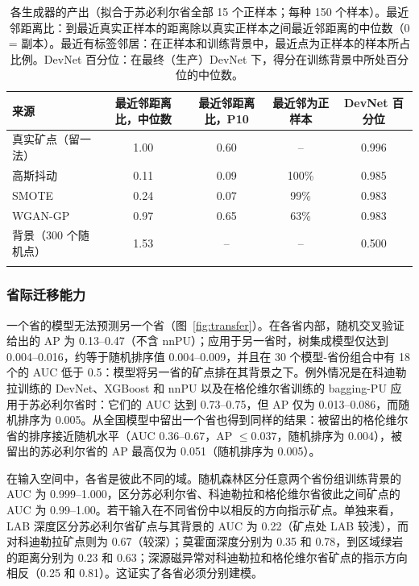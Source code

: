 \documentclass[pdflatex,sn-apa]{sn-jnl}
\begin{document}
\begin{table}[t]
\caption{各生成器的产出（拟合于苏必利尔省全部 15 个正样本；每种 150 个样本）。最近邻距离比：到最近真实正样本的距离除以真实正样本之间最近邻距离的中位数（0 = 副本）。最近有标签邻居：在正样本和训练背景中，最近点为正样本的样本所占比例。DevNet 百分位：在最终（生产）DevNet 下，得分在训练背景中所处百分位的中位数。}\label{tab:aug-diag}
\footnotesize
\setlength{\tabcolsep}{2.5pt}
\begin{tabular*}{\textwidth}{@{\extracolsep\fill}lcccc}
\toprule
来源 & 最近邻距离比，中位数 & 最近邻距离比，P10 & 最近邻为正样本 & DevNet 百分位 \\
\midrule
真实矿点（留一法） & 1.00 & 0.60 & -- & 0.996 \\
高斯抖动 & 0.11 & 0.09 & 100\% & 0.985 \\
SMOTE & 0.24 & 0.07 & 99\% & 0.983 \\
WGAN-GP & 0.97 & 0.65 & 63\% & 0.983 \\
背景（300 个随机点） & 1.53 & -- & -- & 0.500 \\
\botrule
\end{tabular*}
\end{table}

\subsubsection{省际迁移能力}\label{sec:res-transfer}

一个省的模型无法预测另一个省（图~\ref{fig:transfer}）。在各省内部，随机交叉验证给出的 AP 为 0.13--0.47（不含 nnPU）；应用于另一省时，树集成模型仅达到 0.004--0.016，约等于随机排序值 0.004--0.009，并且在 30 个模型-省份组合中有 18 个的 AUC 低于 0.5：模型将另一省的矿点排在其背景之下。例外情况是在科迪勒拉训练的 DevNet、XGBoost 和 nnPU 以及在格伦维尔省训练的 bagging-PU 应用于苏必利尔省时：它们的 AUC 达到 0.73--0.75，但 AP 仅为 0.013--0.086，而随机排序为 0.005。从全国模型中留出一个省也得到同样的结果：被留出的格伦维尔省的排序接近随机水平（AUC 0.36--0.67，AP $\leq 0.037$，随机排序为 0.004），被留出的苏必利尔省的 AP 最高仅为 0.051（随机排序为 0.005）。

在输入空间中，各省是彼此不同的域。随机森林区分任意两个省份组训练背景的 AUC 为 0.999--1.000，区分苏必利尔省、科迪勒拉和格伦维尔省彼此之间矿点的 AUC 为 0.99--1.00。若干输入在不同省份中以相反的方向指示矿点。单独来看，LAB 深度区分苏必利尔省矿点与其背景的 AUC 为 0.22（矿点处 LAB 较浅），而对科迪勒拉矿点则为 0.67（较深）；莫霍面深度分别为 0.35 和 0.78，到区域绿岩的距离分别为 0.23 和 0.63；深源磁异常对科迪勒拉和格伦维尔省矿点的指示方向相反（0.25 和 0.81）。这证实了各省必须分别建模。
\end{document}
